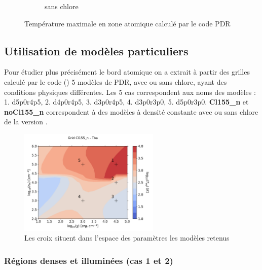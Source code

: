 \begin{figure}[!htbp]
\begin{subfigure}[t]{0.45\textwidth}
        \caption{sans chlore}
    \end{subfigure}
    \caption{Température maximale en zone atomique calculé par le code PDR \uncinq}
    \label{fig:Cl:grid:mapTmax}
\end{figure}


\subsection{Utilisation de modèles particuliers}

Pour étudier plus précisément le bord atomique on a extrait à partir des grilles calculé par le code (\uncinq) 5 modèles de PDR, avec ou sans chlore, ayant des conditions physiques différentes. Les 5 cas correspondent aux noms des modèles : 1. d5p0r4p5, 2. d4p0r4p5, 3. d3p0r4p5, 4. d3p0r3p0,  5. d5p0r3p0. \textbf{Cl155\_n} et \textbf{noCl155\_n} correspondent à des modèles à densité constante avec ou sans chlore de la version \uncinq. 

\begin{figure}[!htbp]
    \centering
        \centering \includegraphics[trim = {0 0 0 1.5cm},clip,width=0.6\textwidth]{figure/Cl/grid/mapT_cross.pdf}
        \caption{Les croix situent dans l'espace des paramètres les modèles retenus}
\end{figure}

\subsubsection{Régions denses et illuminées (cas 1 et 2)}

